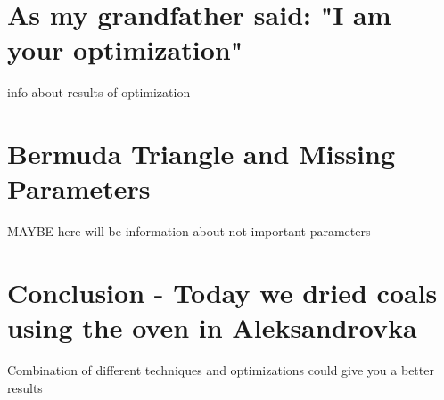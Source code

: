 \section{As my grandfather said: "I am your optimization"}
info about results of optimization

\section{Bermuda Triangle and Missing Parameters}
MAYBE here will be information about not important parameters

\section*{Conclusion - Today we dried coals using the oven in Aleksandrovka}
Combination of different techniques and optimizations could give you a better results 